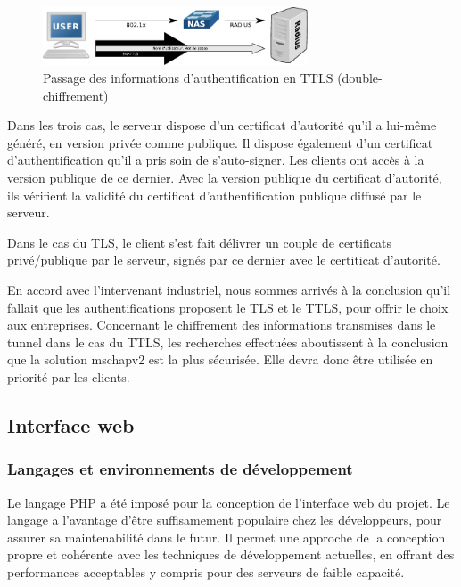 \begin{figure}[!h]
	\begin{center}
		\includegraphics[width=0.7\textwidth]{img/ttls.pdf}
	\end{center}
	\caption{Passage des informations d'authentification en TTLS (double-chiffrement)}
	\label{ttls}
\end{figure}

Dans les trois cas, le serveur dispose d'un  certificat d'autorité qu'il a lui-même généré, en version privée comme publique. Il dispose également d'un certificat d'authentification qu'il a pris soin de s'auto-signer. Les clients ont accès à la version publique de ce dernier. Avec la version publique du certificat d'autorité, ils vérifient la validité du certificat d'authentification publique diffusé par le serveur.

Dans le cas du TLS, le client s'est fait délivrer un couple de certificats privé/publique par le serveur, signés par ce dernier avec le certiticat d'autorité.

En accord avec l'intervenant industriel, nous sommes arrivés à la conclusion qu'il fallait que les authentifications proposent le TLS et le TTLS, pour offrir le choix aux entreprises. Concernant le chiffrement des informations transmises dans le tunnel dans le cas du TTLS, les recherches effectuées aboutissent à la conclusion que la solution mschapv2 est la plus sécurisée. Elle devra donc être utilisée en priorité par les clients.

\subsection{Interface web}
\subsubsection{Langages et environnements de développement}

Le langage PHP a été imposé pour la conception de l'interface web du projet. Le langage a l'avantage d'être suffisamement populaire chez les développeurs, pour assurer sa maintenabilité dans le futur. Il permet une approche de la conception propre et cohérente avec les techniques de développement actuelles, en offrant des performances acceptables y compris pour des serveurs de faible capacité.

